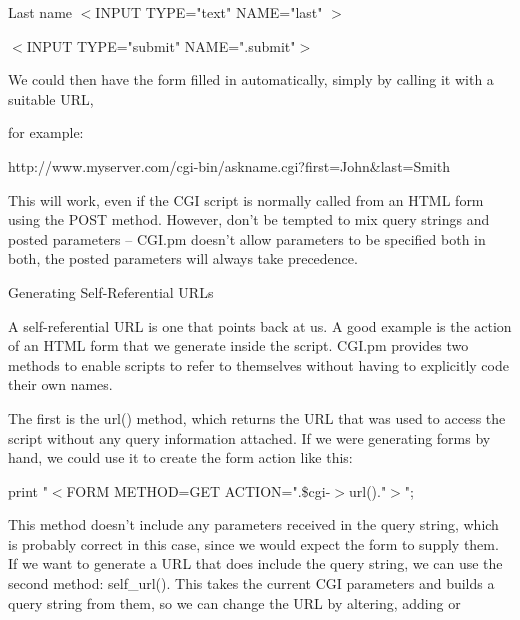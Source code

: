 \documentclass[a4paper,11pt]{book}
\begin{document}
\noindent 

\noindent 

\noindent Last name $<$INPUT TYPE="text" NAME="last" $>$

\noindent 

\noindent 

\noindent $<$INPUT TYPE="submit" NAME=".submit"$>$

\noindent 

\noindent We  could  then  have  the  form  filled  in  automatically,  simply  by  calling  it  with  a  suitable  URL,

\noindent for example:

\noindent 

\noindent http://www.myserver.com/cgi-bin/askname.cgi?first=John\&last=Smith

\noindent 

\noindent This will work, even if the CGI script is normally called from an HTML form using the POST method. However, don't be tempted to mix query strings and posted parameters -- CGI.pm doesn't allow parameters to be specified both in both, the posted parameters will always take precedence.

\noindent 

\noindent Generating Self-Referential URLs

\noindent 

\noindent A self-referential URL is one that points back at us. A good example is the action of an HTML form that we generate inside the script. CGI.pm provides two methods to enable scripts to refer to themselves without having to explicitly code their own names.

\noindent 

\noindent The first is the url() method, which returns the URL that was used to access the script without any query information attached. If we were generating forms by hand, we could use it to create the form action like this:

\noindent 

\noindent print "$<$FORM METHOD=GET ACTION=".\$cgi-$>$url()."$>$";

\noindent 

\noindent This method doesn't include any parameters received in the query string, which is probably correct in this case, since we would expect the form to supply them. If we want to generate a URL that does include the query string, we can use the second method: self\_url(). This takes the current CGI parameters and builds a query string from them, so we can change the URL by altering, adding or
\end{document}
